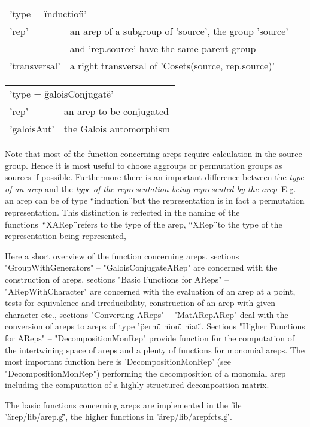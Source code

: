 \begin{tabular}{p{2.5cm}p{10cm}}
\multicolumn{2}{l}{'type = \"induction\"\:'}\\
'rep'    & an arep of a subgroup of 'source', the group 'source'\\
 & and 'rep.source' have the same parent group\\
'transversal' & a right transversal of 'Cosets(source, rep.source)'
\end{tabular}

\begin{tabular}{p{2.5cm}p{10cm}}
\multicolumn{2}{l}{'type = \"galoisConjugate\"\:'}\\
'rep'    & an arep to be conjugated\\
'galoisAut' & the Galois automorphism
\end{tabular}

\bigskip
Note that most of the function concerning areps require calculation in
the source group. Hence it is most useful to choose aggroups or
permutation groups as sources if possible. Furthermore there is an
important difference between the {\em type of an arep} and the {\em
type of the representation being represented by the arep}\:\ E.g. an
arep can be of type ``induction\"\ but the representation is in fact a
permutation representation.  This distinction is reflected in the
naming of the functions\:\ ``XARep\"\ refers to the type of the arep,
``XRep\"\ to the type of the representation being represented,

Here a short overview of the function concerning areps.
sections "GroupWithGenerators" -- "GaloisConjugateARep" are 
concerned with the construction of areps, sections 
"Basic Functions for AReps" -- "ARepWithCharacter" are
concerned with the evaluation of an arep at a point, tests for
equivalence and irreducibility, construction of an arep
with given character etc., sections "Converting AReps" --
"MatARepARep" deal with the conversion of areps to areps 
of type '\"perm\", \"mon\", \"mat\"'. 
Sections "Higher Functions for AReps" -- "DecompositionMonRep"
provide function for the computation of the intertwining space
of areps and a plenty of functions for monomial areps. The
most important function here is 'DecompositionMonRep'
(see "DecompositionMonRep") performing the decomposition of 
a monomial arep including the computation of a highly
structured decomposition matrix. 

The basic functions concerning areps are implemented in the file
'\"arep/lib/arep.g\"', the higher functions in
'\"arep/lib/arepfcts.g\"'.

